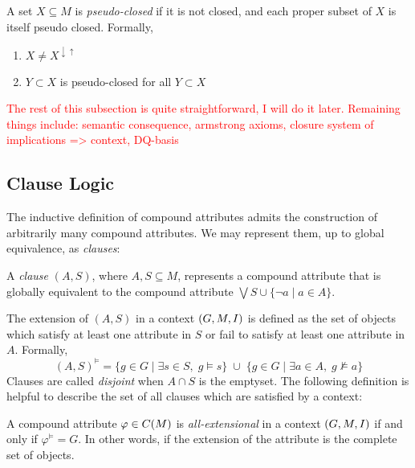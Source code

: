 \begin{definition}
	\label{definition:pseudo-closed}

	A set $X\subseteq M$ is \emph{pseudo-closed} if it is not closed, and each proper subset of $X$ is itself pseudo
	closed. Formally,
	\begin{enumerate}
		\item $X \neq X^{\downarrow \uparrow}$

		\item $Y \subset X$ is pseudo-closed for all $Y \subset X$
	\end{enumerate}
\end{definition}

\textcolor{red}{The rest of this subsection is quite straightforward, I will do it later. Remaining things include: semantic
consequence, armstrong axioms, closure system of implications => context, DQ-basis}

\clearpage
\subsection{Clause Logic}
\label{subsection:clause-logic}

The inductive definition of compound attributes admits the construction of arbitrarily many compound attributes. We may
represent them, up to global equivalence, as \textit{clauses}:
\begin{definition}
	\label{definition:clauses}

	A \emph{clause} $(A,S)$, where $A,S \subseteq M$, represents a compound attribute that is globally equivalent to the compound
	attribute $\bigvee S \cup \{\neg a \mid a \in A\}$.
\end{definition}

The extension of $(A,S)$ in a context $(G,M,\mathrel{I})$ is defined as the set of objects which satisfy at least one attribute in $S$
or fail to satisfy at least one attribute in $A$. Formally,
\[
	(A,S)^{\vDash}= \{ g \in G \mid \exists s \in S,\; g\vDash s \} \;\cup\; \{ g \in G \mid \exists a \in A,\; g \nvDash a
	\}
\]
Clauses are called \textit{disjoint} when $A \cap S$ is the emptyset. The following definition is helpful to describe the
set of all clauses which are satisfied by a context:
%
\begin{definition}
	\label{definition:all-extensional}

	A compound attribute $\varphi \in C(M)$ is \emph{all-extensional} in a context $(G,M,\mathrel{I})$ if and only if $\varphi^{\vDash}
	= G$. In other words, if the extension of the attribute is the complete set of objects.
\end{definition}

